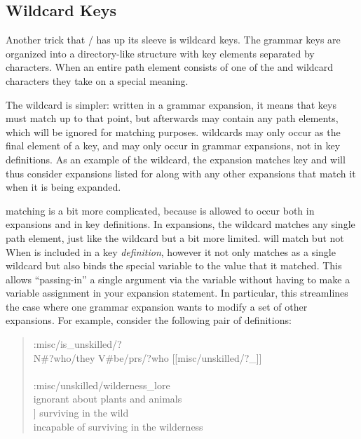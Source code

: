 \subsection{Wildcard Keys}

Another trick that \dunyazad/ has up its sleeve is wildcard keys.
%
The grammar keys are organized into a directory-like structure with key elements separated by \exchar{/} characters.
%
When an entire path element consists of one of the  and \exchar{*} wildcard characters they take on a special meaning.


The \exchar{*} wildcard is simpler: written in a grammar expansion, it means that keys must match up to that point, but afterwards may contain any path elements, which will be ignored for matching purposes.
%
\exchar{*} wildcards may only occur as the final element of a key, and may only occur in grammar expansions, not in key definitions.
%
As an example of the \exchar{*} wildcard, the expansion  matches key  and will thus consider expansions listed for  along with any other expansions that match it when it is being expanded.


 matching is a bit more complicated, because  is allowed to occur both in expansions and in key definitions.
%
In expansions, the  wildcard matches any single path element, just like the \exchar{*} wildcard but a bit more limited.
%
 will match  but not 
%
When  is included in a key \emph{definition}, however it not only matches as a single wildcard but also binds the special variable \prq{\_}{} to the value that it matched.
%
This allows ``passing-in'' a single argument via the \prq{\_}{} variable without having to make a variable assignment in your expansion statement.
%
In particular, this streamlines the case where one grammar expansion wants to modify a set of other expansions.
%
For example, consider the following pair of definitions:

\begin{quote}
\ttfamily
:misc/is\_unskilled/? \\
N\#?who/they V\#be/prs/?who [[misc/unskilled/?\_]] \\
\\
:misc/unskilled/wilderness\_lore \\
ignorant about plants and animals \\ \relax
[[misc/bad\_at]] surviving in the wild \\
incapable of surviving in the wilderness
\end{quote}

